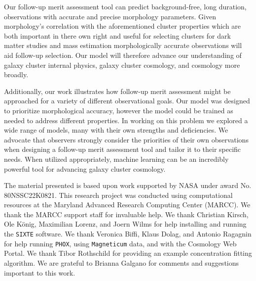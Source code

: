 \documentclass[twocolumn, 11pt]{aastex63}%
\begin{document}
Our follow-up merit assessment tool can predict background-free, long duration, observations with accurate and precise morphology parameters. Given morphology’s correlation with the aforementioned cluster properties \textemdash{} which are both important in there own right and useful for selecting clusters for dark matter studies and mass estimation \textemdash{} morphologically accurate observations will aid follow-up selection. Our model will therefore advance our understanding of galaxy cluster internal physics, galaxy cluster cosmology, and cosmology more broadly.

Additionally, our work illustrates how follow-up merit assessment might be approached for a variety of different observational goals. Our model was designed to prioritize morphological accuracy, however the model could be trained as needed to address different properties. In working on this problem we explored a wide range of models, many with their own strengths and deficiencies. We advocate that observers strongly consider the priorities of their own observations when designing a follow-up merit assessment tool and tailor it to their specific needs. When utilized appropriately, machine learning can be an incredibly powerful tool for advancing galaxy cluster cosmology.

\acknowledgements
The material presented is based upon work supported by NASA under award No. 80NSSC22K0821. This research project was conducted using computational resources at the Maryland Advanced Research Computing Center (MARCC). We thank the MARCC support staff for invaluable help. We thank Christian Kirsch, Ole König, Maximilian Lorenz, and Joern Wilms for help installing and running the \texttt{SIXTE} software. We thank Veronica Biffi, Klaus Dolag, and Antonio Ragagnin for help running \texttt{PHOX}, using \texttt{Magneticum} data, and with the Cosmology Web Portal. We thank Tibor Rothschild for providing an example concentration fitting algorithm. We are grateful to Brianna Galgano for comments and suggestions important to this work.



\newpage
\
\newpage


\end{document}
